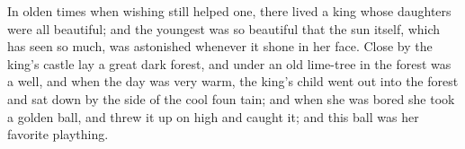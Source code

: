 In olden times when wish\-ing still helped one, there lived a king
whose daugh\-ters were all beau\-ti\-ful; and the young\-est was so
beau\-ti\-ful that the sun it\-self, which has seen so much, was
aston\-ished when\-ever it shone in her face. Close by the king's
castle lay a great dark for\-est, and un\-der an old lime-tree in the
for\-est was a well, and when the day was very warm, the king's child
went out into the for\-est and sat down by the side of the cool foun\-
tain; and when she was bored she took a golden ball, and threw it up
on high and caught it; and this ball was her favor\-ite play\-thing.
